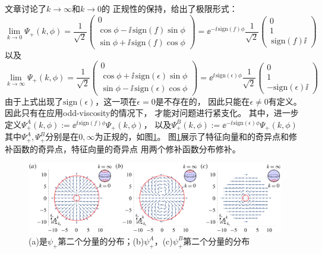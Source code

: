 \documentclass[UTF8,zihao=5]{ctexart} %
\begin{document}
文章讨论了$k\rightarrow\infty$和$k\rightarrow0$的
正规性的保持，给出了极限形式：
\begin{equation}
    \lim_{k\rightarrow 0} \Psi_+(k,\phi) = \dfrac{1}{\sqrt 2}\begin{pmatrix}0 \\ \cos \phi - \ii \,\text{sign}(f) \sin \phi \\ \sin \phi + \ii \,\text{sign}(f) \cos \phi  \end{pmatrix} = \ee^{- \ii \,\text{sign}(f) \phi }\dfrac{1}{\sqrt 2}\begin{pmatrix}0 \\ 1 \\ \,\text{sign}(f) \ii  \end{pmatrix}
\end{equation}
以及
\begin{equation}
    \lim_{k\rightarrow \infty} \Psi_+(k,\phi) = \dfrac{1}{\sqrt 2}\begin{pmatrix}0 \\ \cos \phi + \ii \,\text{sign}(\epsilon)\sin \phi \\ \sin \phi - \ii \,\text{sign}(\epsilon)\cos \phi  \end{pmatrix} = \ee^{ \ii \,\text{sign}(\epsilon)\phi }\dfrac{1}{\sqrt 2}\begin{pmatrix}0 \\ 1 \\ -\text{sign}(\epsilon) \ii  \end{pmatrix}
\end{equation}
由于上式出现了$\text{sign}(\epsilon)$，这一项在$\epsilon=0$是不存在的，
因此只能在$\epsilon\neq0$有定义。因此只有在应用odd-viscosity的情况下，
才能对问题进行紧支化。
其中，进一步定义$\Psi_+^A(k,\phi) := \ee^{\ii \,\text{sign}(f) \phi} \Psi_+(k,\phi)$，
以及$\Psi_+^B(k,\phi) := \ee^{-\ii \,\text{sign}(\epsilon)\phi} \Psi_+(k,\phi)$
其中$\Psi_+^A,\Psi_+^B$分别是在$0,\infty$为正规的，如图\ref{fig:2}。
图\ref{fig:2}展示了特征向量和的奇异点和修补函数的奇异点，特征向量的奇异点
用两个修补函数分布修补。

\begin{figure}[H]
    \centering
    \includegraphics[width=16cm]{fig2.png}  %
    \caption{(a)是$\psi_+$第二个分量的分布；(b)$\psi_+^A$，(c)$\psi_+^B$第二个分量的分布}
    \label{fig:2}
\end{figure}
\end{document}

